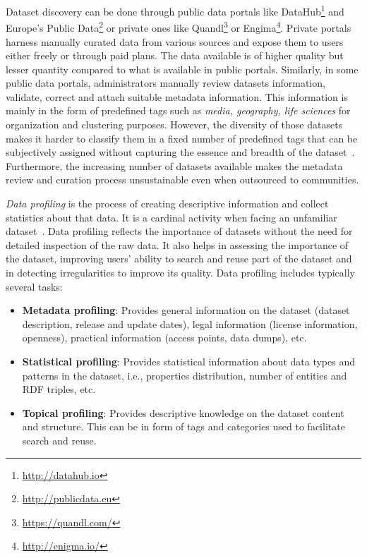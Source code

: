 \documentclass[runningheads,a4paper]{llncs}
\begin{document}
Dataset discovery can be done through public data portals like DataHub\footnote{\url{http://datahub.io}} and Europe's Public Data\footnote{\url{http://publicdata.eu}} or private ones like Quandl\footnote{\url{https://quandl.com/}} or Engima\footnote{\url{http://enigma.io/}}. Private portals harness manually curated data from various sources and expose them to users either freely or through paid plans. The data available is of higher quality but lesser quantity compared to what is available in public portals. Similarly, in some public data portals, administrators manually review datasets information, validate, correct and attach suitable metadata information. This information is mainly in the form of predefined tags such as \textit{media, geography, life sciences} for organization and clustering purposes. However, the diversity of those datasets makes it harder to classify them in a fixed number of predefined tags that can be subjectively assigned without capturing the essence and breadth of the dataset~\cite{6690016}. Furthermore, the increasing number of datasets available makes the metadata review and curation process unsustainable even when outsourced to communities.

\textit{Data profiling} is the process of creating descriptive information and collect statistics about that data. It is a cardinal activity when facing an unfamiliar dataset~\cite{semwebprofiling}. Data profiling reflects the importance of datasets without the need for detailed inspection of the raw data.  It also helps in assessing the importance of the dataset, improving users' ability to search and reuse part of the dataset and in detecting irregularities to improve its quality. Data profiling includes typically several tasks:
\begin{itemize}
  \item \textbf{Metadata profiling}: Provides general information on the dataset (dataset description, release and update dates), legal information (license information, openness), practical information (access points, data dumps), etc.
  \item \textbf{Statistical profiling}: Provides statistical information about data types and patterns in the dataset, i.e., properties distribution, number of entities and RDF triples, etc.
  \item \textbf{Topical profiling}: Provides descriptive knowledge on the dataset content and structure. This can be in form of tags and categories used to facilitate search and reuse.
\end{itemize}
\end{document}

